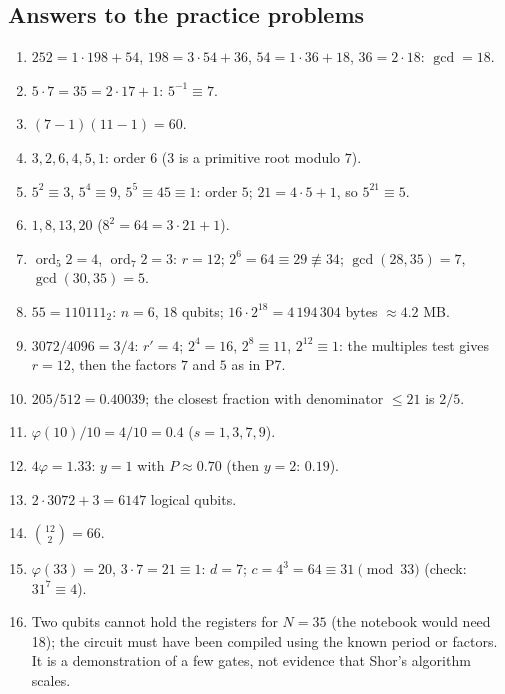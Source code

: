 \documentclass[11pt,a4paper,openany]{book}
\begin{document}
\subsection*{Answers to the practice problems}
\begin{enumerate}[label=\textbf{P\arabic*.}, leftmargin=2.6em, itemsep=3pt]
\item $252 = 1\cdot198 + 54$, $198 = 3\cdot54 + 36$, $54 = 1\cdot36 + 18$, $36 = 2\cdot18$: $\gcd = 18$.
\item $5\cdot7 = 35 = 2\cdot17 + 1$: $5^{-1} \equiv 7$.
\item $(7 - 1)(11 - 1) = 60$.
\item $3, 2, 6, 4, 5, 1$: order $6$ ($3$ is a primitive root modulo $7$).
\item $5^2 \equiv 3$, $5^4 \equiv 9$, $5^5 \equiv 45 \equiv 1$: order $5$; $21 = 4\cdot5 + 1$, so $5^{21} \equiv 5$.
\item $1, 8, 13, 20$ ($8^2 = 64 = 3\cdot21 + 1$).
\item $\operatorname{ord}_5 2 = 4$, $\operatorname{ord}_7 2 = 3$: $r = 12$; $2^6 = 64 \equiv 29 \not\equiv 34$; $\gcd(28, 35) = 7$, $\gcd(30, 35) = 5$.
\item $55 = 110111_2$: $n = 6$, $18$ qubits; $16\cdot2^{18} = 4\,194\,304$ bytes $\approx4.2$ MB.
\item $3072/4096 = 3/4$: $r' = 4$; $2^4 = 16$, $2^8 \equiv 11$, $2^{12} \equiv 1$: the multiples test gives $r = 12$, then the factors $7$ and $5$ as in P7.
\item $205/512 = 0.40039$; the closest fraction with denominator $\le 21$ is $2/5$.
\item $\varphi(10)/10 = 4/10 = 0.4$ ($s = 1, 3, 7, 9$).
\item $4\varphi = 1.33$: $y = 1$ with $P \approx 0.70$ (then $y = 2$: $0.19$).
\item $2\cdot3072 + 3 = 6147$ logical qubits.
\item $\binom{12}{2} = 66$.
\item $\varphi(33) = 20$, $3\cdot7 = 21 \equiv 1$: $d = 7$; $c = 4^3 = 64 \equiv 31 \pmod{33}$ (check: $31^7 \equiv 4$).
\item Two qubits cannot hold the registers for $N = 35$ (the notebook would need 18); the circuit must have been compiled using the known period or factors.
      It is a demonstration of a few gates, not evidence that Shor's algorithm scales.
\end{enumerate}
\end{document}
